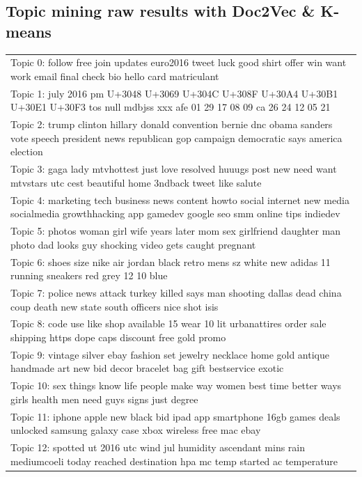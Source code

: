 \documentclass[11pt]{article}
\begin{document}
\begin{appendices}
\section{Topic mining raw results with Doc2Vec \& K-means}

\begin{table}[H]
    \centering
    \begin{tabular}{|p{\linewidth}|}
    \hline
    Topic 0: follow free join updates euro2016 tweet luck good shirt offer win want work email final check bio hello card matriculant\\
    Topic 1: july 2016 pm U+3048 U+3069 U+304C U+308F U+30A4 U+30B1 U+30E1 U+30F3 tos null mdbjss xxx afe 01 29 17 08 09 ca 26 24 12 05 21\\
    Topic 2: trump clinton hillary donald convention bernie dnc obama sanders vote speech president news republican gop campaign democratic says america election\\
    Topic 3: gaga lady mtvhottest just love resolved huuugs post new need want mtvstars utc cest beautiful home 3ndback tweet like salute\\
    Topic 4: marketing tech business news content howto social internet new media socialmedia growthhacking app gamedev google seo smm online tips indiedev\\
    Topic 5: photos woman girl wife years later mom sex girlfriend daughter man photo dad looks guy shocking video gets caught pregnant\\
    Topic 6: shoes size nike air jordan black retro mens sz white new adidas 11 running sneakers red grey 12 10 blue\\
    Topic 7: police news attack turkey killed says man shooting dallas dead china coup death new state south officers nice shot isis\\
    Topic 8: code use like shop available 15 wear 10 lit urbanattires order sale shipping https dope caps discount free gold promo\\
    Topic 9: vintage silver ebay fashion set jewelry necklace home gold antique handmade art new bid decor bracelet bag gift bestservice exotic\\
    Topic 10: sex things know life people make way women best time better ways girls health men need guys signs just degree\\
    Topic 11: iphone apple new black bid ipad app smartphone 16gb games deals unlocked samsung galaxy case xbox wireless free mac ebay\\
    Topic 12: spotted ut 2016 utc wind jul humidity ascendant mins rain mediumcoeli today reached destination hpa mc temp started ac temperature\\

\end{tabular}
\end{table}
\end{appendices}
\end{document}
